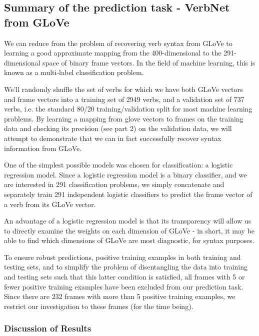 \documentclass[11pt,a4paper]{article}
\begin{document}
\subsection{Summary of the prediction task - VerbNet from GLoVe}

We can reduce from the problem of recovering verb syntax from GLoVe to learning a good approximate mapping from the 400-dimensional to the 291-dimensional space of binary frame vectors. In the field of machine learning, this is known as a multi-label classification problem.

We’ll randomly shuffle the set of verbs for which we have both GLoVe vectors and frame vectors into a training set of 2949 verbs, and a validation set of 737 verbs, i.e. the standard 80/20 training/validation split for most machine learning problems. By learning a mapping from glove vectors to frames on the training data and checking its precision (see part 2) on the validation data, we will attempt to demonstrate that we can in fact successfully recover syntax information from GLoVe.

One of the simplest possible models was chosen for classification: a logistic regression model. Since a logistic regression model is a binary classifier, and we are interested in 291 classification problems, we simply concatenate and separately train 291 independent logistic classifiers to predict the frame vector of a verb from its GLoVe vector.

An advantage of a logistic regression model is that its transparency will allow us to directly examine the weights on each dimension of GLoVe - in short, it may be able to find which dimensions of GLoVe are most diagnostic, for syntax purposes.

To ensure robust predictions, positive training examples in both training and testing sets, and to simplify the problem of disentangling the data into training and testing sets such that this latter condition is satisfied, all frames with 5 or fewer positive training examples have been excluded from our prediction task. Since there are 232 frames with more than 5 positive training examples, we restrict our investigation to these frames (for the time being).

\subsubsection{Discussion of Results}
\end{document}
